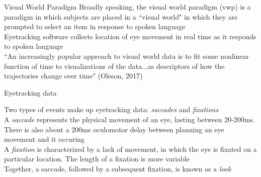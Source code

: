 \documentclass{beamer}
\begin{document}
\begin{frame}{Visual World Paradigm}
Broadly speaking, the visual world paradigm (vwp) is a paradigm in which subjects are placed in a ``visual world" in which they are prompted to select an item in response to spoken language \newline \\

Eyetracking software collects location of eye movement in real time as it responds to spoken language \newline \\

``An increasingly popular approach to visual world data is to fit some nonlinear function of time to visualizations of the data...as descriptors of how the trajectories change over time" (Oleson, 2017) \newline \\



\end{frame}

\begin{frame}{Eyetracking data}

Two types of events make up eyetracking data: \textit{saccades} and \textit{fixations} \newline \\

A \textit{saccade} represents the physical movement of an eye, lasting between 20-200ms. There is also about a 200ms oculomotor delay between planning an eye movement and it occuring \newline \\

A \textit{fixation} is characterized by a lack of movement, in which the eye is fixated on a particular location. The length of a fixation is more  variable \newline \\

Together, a saccade, followed by a subsequent fixation, is known as a \textit{look}
\end{frame}
\end{document}
